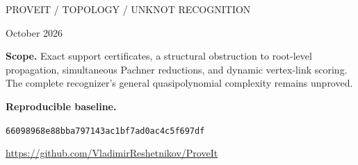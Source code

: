 \documentclass[11pt,letterpaper]{article}
\theoremstyle{definition}
\theoremstyle{remark}
\newcommand{\basecommit}{\texttt{66098968e88bba797143ac1bf7ad0ac4c5f697df}}
\begin{document}
\begin{titlepage}
\color{navy}
\noindent\textsf{PROVEIT / TOPOLOGY / UNKNOT RECOGNITION}\par
\vspace{1.0in}
\vspace{0.15in}
\vspace{0.15in}
\vspace{0.35in}
\par
\vspace{0.5in}
\par
\vspace{0.15in}
 October 2026\par
\vfill
\color{black}
\noindent\textbf{Scope.} Exact support certificates, a structural obstruction to
root-level propagation, simultaneous Pachner reductions, and dynamic
vertex-link scoring. The complete recognizer's general quasipolynomial
complexity remains unproved.\par
\vspace{0.25in}
\noindent\textbf{Reproducible baseline.}\par
\noindent\basecommit\par
\smallskip
\noindent\url{https://github.com/VladimirReshetnikov/ProveIt}
\end{titlepage}


\tableofcontents
\clearpage









\appendix


\end{document}
